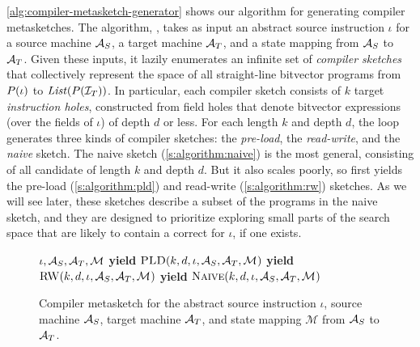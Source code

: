 \autoref{alg:compiler-metasketch-generator} shows our algorithm for generating
compiler metasketches. The algorithm, \CMS, takes as input an abstract source
instruction $\iota$ for a source machine $\mathcal{A}_S$, a target machine $\mathcal{A}_T$,
and a state mapping \Map from $\mathcal{A}_S$ to $\mathcal{A}_T$. Given these inputs, it
lazily enumerates an infinite set of \emph{compiler sketches} that collectively
represent the space of all straight-line bitvector programs from $P(\iota)$
to $\mathit{List}(P(\mathcal{I}_T))$. In particular, each compiler sketch
consists of $k$ target \emph{instruction holes}, constructed from {field holes}
that denote bitvector expressions (over the fields of $\iota$) of depth $d$ or
less. For each length $k$ and depth $d$, the \CMS loop generates three kinds of
compiler sketches: the \emph{pre-load}, the \emph{read-write}, and the
\emph{naive} sketch. The naive sketch (\autoref{s:algorithm:naive}) is the most
general, consisting of all candidate \minicompilers of length $k$ and depth $d$.
But it also scales poorly, so \CMS first yields the pre-load
(\autoref{s:algorithm:pld}) and  read-write (\autoref{s:algorithm:rw}) sketches.
As we will see later, these sketches describe a subset of the programs in the
naive sketch, and they are designed to prioritize exploring small parts of the
search space that are likely to contain a correct \minicompiler for $\iota$, if
one exists.

\begin{figure}[t]
\begin{algorithmic}[1] 
    {$\iota, \mathcal{A}_S, \mathcal{A}_T, \mathcal{M}_{}$} 
     
       
        \State \textbf{yield} $\LCS(k,d,\iota,\arm_S,\arm_T,\Map)$ 
        \State \textbf{yield} $\RW(k,d,\iota,\arm_S,\arm_T,\Map)$ 
        \State \textbf{yield} $\Naive(k,d,\iota,\arm_S,\arm_T,\Map)$ 
      \EndFor
    \EndFor
  \EndFunction
\end{algorithmic}
\caption{Compiler metasketch for the abstract source instruction
$\iota$, source machine $\mathcal{A}_S$, target machine $\mathcal{A}_T$, and state mapping
$\mathcal{M}$ from $\mathcal{A}_S$ to
$\mathcal{A}_T$.\tighten}\label{alg:compiler-metasketch-generator}
\end{figure}


